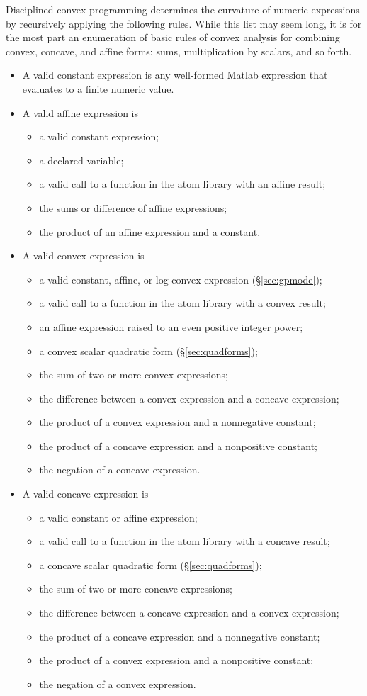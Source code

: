 \documentclass[12pt]{article}
\begin{document}
Disciplined convex programming determines the curvature of numeric
expressions by recursively applying the following rules.
While this list may seem long, it is for the most part an enumeration of basic
rules of convex analysis for combining convex, concave, and affine forms: sums,
multiplication by scalars, and so forth.
\begin{itemize}
\item A valid constant expression 
is any well-formed Matlab expression that 
evaluates to a finite numeric value.
\item A valid affine expression is
\begin{itemize}
\item a valid constant expression;
\item a declared %
variable;
\item a valid call to a function in the atom library with an affine result;
\item the sums or difference of affine expressions;
\item the product of an affine expression and a constant.
\end{itemize}
\item A valid convex expression is
\begin{itemize}
\item a valid constant, affine, or log-convex expression 
(\S\ref{sec:gpmode});
\item a valid call to a function in the atom library with a convex result;
\item an affine expression raised to an even positive integer power;
\item a convex scalar quadratic form (\S\ref{sec:quadforms});
\item the sum of two or more convex expressions;
\item the difference between a convex expression and a concave expression;
\item the product of a convex expression and a nonnegative constant;
\item the product of a concave expression and a nonpositive constant;
\item the negation of a concave expression.
\end{itemize}
\item A valid concave expression is
\begin{itemize}
\item a valid constant or affine expression;
\item a valid call to a function in the atom library with a concave result;
\item a concave scalar quadratic form (\S\ref{sec:quadforms});
\item the sum of two or more concave expressions;
\item the difference between a concave expression and a convex expression;
\item the product of a concave expression and a nonnegative constant; 
\item the product of a convex expression and a nonpositive constant;
\item the negation of a convex expression.
\end{itemize}
\end{itemize}
\end{document}

